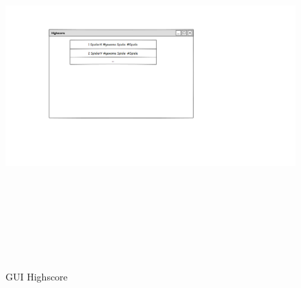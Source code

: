\begin{center}
	\begin{figure}
		\includegraphics[width=170mm, height =140mm]{PencilProjectData/highscore}
		\caption{GUI Highscore}
	\end{figure}
	

\end{center}
